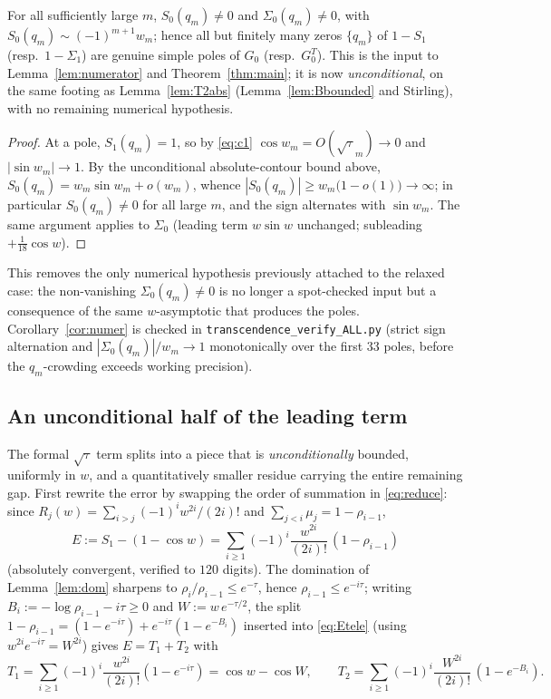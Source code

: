\begin{corollary}\label{cor:numer}
For all sufficiently large $m$, $S_0(q_m)\ne0$ and $\Sigma_0(q_m)\ne0$, with
$S_0(q_m)\sim(-1)^{m+1}w_m$; hence all but finitely many zeros $\{q_m\}$ of $1-S_1$
\textup(resp.\ $1-\Sigma_1$\textup) are genuine simple poles of $G_0$ \textup(resp.\
$G^{T}_0$\textup). This is the input to Lemma~\ref{lem:numerator} and
Theorem~\ref{thm:main}; it is now \emph{unconditional}, on the same footing as
Lemma~\ref{lem:T2abs} \textup(Lemma~\ref{lem:Bbounded} and Stirling\textup), with no remaining
numerical hypothesis.
\end{corollary}

\begin{proof}
At a pole, $S_1(q_m)=1$, so by \eqref{eq:c1} $\cos w_m=O(\sqrt\tau_m)\to0$ and
$|\sin w_m|\to1$. By the unconditional absolute-contour bound above, $S_0(q_m)=w_m\sin w_m+o(w_m)$, whence
$|S_0(q_m)|\ge w_m\bigl(1-o(1)\bigr)\to\infty$; in particular $S_0(q_m)\ne0$ for all large $m$,
and the sign alternates with $\sin w_m$. The same argument
applies to $\Sigma_0$ \textup(leading term $w\sin w$ unchanged; subleading $+\tfrac1{18}\cos w$\textup).
\end{proof}

\noindent This removes the only numerical hypothesis previously attached to the relaxed
case: the non-vanishing $\Sigma_0(q_m)\ne0$ is no longer a spot-checked input but a
consequence of the same $w$-asymptotic that produces the poles. Corollary~\ref{cor:numer}
is checked in \texttt{transcendence\_verify\_ALL.py} (strict sign alternation and
$|\Sigma_0(q_m)|/w_m\to1$ monotonically over the first $33$ poles, before the
$q_m$-crowding exceeds working precision).

\subsection{An unconditional half of the leading term}
\label{ss:split}

The formal $\sqrt\tau$ term splits into a piece that is \emph{unconditionally} bounded,
uniformly in $w$, and a quantitatively smaller residue carrying the entire remaining gap.
First rewrite the error by swapping the order of summation in \eqref{eq:reduce}: since
$R_j(w)=\sum_{i>j}(-1)^{i}w^{2i}/(2i)!$ and $\sum_{j<i}\mu_j=1-\rho_{i-1}$,
\begin{equation}\label{eq:Etele}
  E:=S_1-(1-\cos w)=\sum_{i\ge1}(-1)^{i}\frac{w^{2i}}{(2i)!}\,(1-\rho_{i-1})
\end{equation}
(absolutely convergent, verified to $120$ digits). The domination of
Lemma~\ref{lem:dom} sharpens to $\rho_{i}/\rho_{i-1}\le e^{-\tau}$, hence
$\rho_{i-1}\le e^{-i\tau}$; writing $B_i:=-\log\rho_{i-1}-i\tau\ge0$ and
$W:=w\,e^{-\tau/2}$, the split $1-\rho_{i-1}=(1-e^{-i\tau})+e^{-i\tau}(1-e^{-B_i})$
inserted into \eqref{eq:Etele} (using $w^{2i}e^{-i\tau}=W^{2i}$) gives $E=T_1+T_2$ with
\begin{equation}\label{eq:T1T2}
  T_1=\sum_{i\ge1}(-1)^{i}\frac{w^{2i}}{(2i)!}(1-e^{-i\tau})=\cos w-\cos W,
  \qquad
  T_2=\sum_{i\ge1}(-1)^{i}\frac{W^{2i}}{(2i)!}\,(1-e^{-B_i}).
\end{equation}

